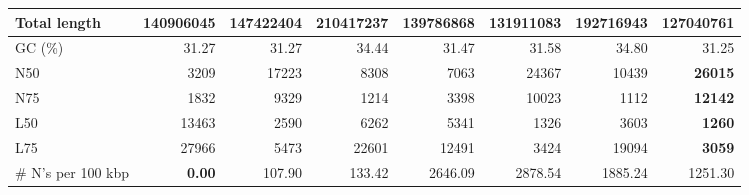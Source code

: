 \documentclass[12pt,a4paper]{article}
\begin{document}
\begin{table}[ht]
\begin{center}
\begin{tabular}{|l*{7}{|r}|}
Total length & 140906045 & 147422404 & {\bf 210417237} & 139786868 & 131911083 & 192716943 & 127040761 \\ \hline
GC (\%) & 31.27 & 31.27 & 34.44 & 31.47 & 31.58 & 34.80 & 31.25 \\ \hline
N50 & 3209 & 17223 & 8308 & 7063 & 24367 & 10439 & {\bf 26015} \\ \hline
N75 & 1832 & 9329 & 1214 & 3398 & 10023 & 1112 & {\bf 12142} \\ \hline
L50 & 13463 & 2590 & 6262 & 5341 & 1326 & 3603 & {\bf 1260} \\ \hline
L75 & 27966 & 5473 & 22601 & 12491 & 3424 & 19094 & {\bf 3059} \\ \hline
\# N's per 100 kbp & {\bf 0.00} & 107.90 & 133.42 & 2646.09 & 2878.54 & 1885.24 & 1251.30 \\ \hline
\end{tabular}
\end{center}
\end{table}
\end{document}
